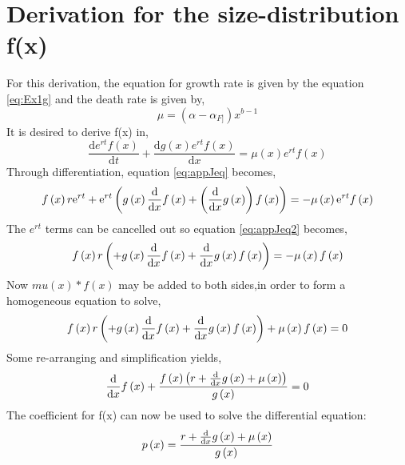 \documentclass{article}
\numberwithin{equation}{section} %
\begin{document}
\section{Derivation for the size-distribution f(x)}\label{a:derivation_fx}
For this derivation, the equation for growth rate is given by the equation \ref{eq:Ex1g} and the death rate is given by,
\begin{equation}
    \mu =  (\alpha-\alpha_{F]})x^{b-1}
\end{equation}
It is desired to derive f(x) in,
\begin{equation}\label{eq:appJeq}
    \dfrac{\mathrm{d}e^{rt}f(x)}{\mathrm{d}t}+\dfrac{\mathrm{d}g(x)e^{rt}f(x)}{\mathrm{d}x}=\mu(x)e^{rt}f(x)
\end{equation}
Through differentiation, equation \ref{eq:appJeq} becomes,
\begin{equation}\label{eq:appJeq2}
    f \left( x \right) r{{\rm e}^{rt}}+{{\rm e}^{rt}} \left( g \left( x
 \right) {\frac {\rm d}{{\rm d}x}}f \left( x \right) + \left( {\frac 
{\rm d}{{\rm d}x}}g \left( x \right)  \right) f \left( x \right) 
 \right) =-\mu \left( x \right) {{\rm e}^{rt}}f \left( x \right) 
\end{equation}
The $e^{rt}$ terms can be cancelled out so equation \ref{eq:appJeq2} becomes,
\begin{equation}
    f \left( x \right)  r\left(+g \left( x \right) {\frac {\rm d}{{\rm d}x}}f
 \left( x \right) + {\frac {\rm d}{{\rm d}x}}g \left( x
 \right)  f \left( x \right) \right)=-\mu \left( x \right) f \left( x
 \right) 
\end{equation}
Now $mu(x)*f(x)$ may be added to both sides,in order to form a homogeneous equation to solve,
\begin{equation}
        f \left( x \right)  r\left(+g \left( x \right) {\frac {\rm d}{{\rm d}x}}f
 \left( x \right) + {\frac {\rm d}{{\rm d}x}}g \left( x
 \right)  f \left( x \right) \right)+\mu \left( x \right) f \left( x
 \right) =0
\end{equation}
Some re-arranging and simplification yields,
\begin{equation}
    {\frac {\rm d}{{\rm d}x}}f \left( x \right) +{\frac {f \left( x
 \right)  \left( r+{\frac {\rm d}{{\rm d}x}}g \left( x \right) +\mu
 \left( x \right)  \right) }{g \left( x \right) }}=0
\end{equation}
The coefficient for f(x) can now be used to solve the differential equation:
\begin{equation}\label{eq:appJeq3}
    p \left( x \right) ={\frac {r+{\frac {\rm d}{{\rm d}x}}g \left( x
 \right) +\mu \left( x \right) }{g \left( x \right) }}
\end{equation}
\end{document}
